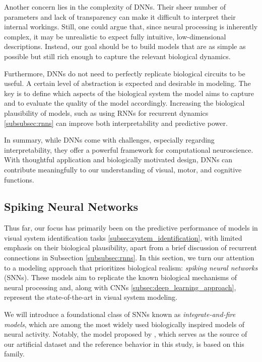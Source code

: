 Another concern lies in the complexity of DNNs. Their sheer number of parameters and lack of transparency can make it difficult to interpret their internal workings. Still, one could argue that, since neural processing is inherently complex, it may be unrealistic to expect fully intuitive, low-dimensional descriptions. Instead, our goal should be to build models that are as simple as possible but still rich enough to capture the relevant biological dynamics.

Furthermore, DNNs do not need to perfectly replicate biological circuits to be useful. A certain level of abstraction is expected and desirable in modeling. The key is to define which aspects of the biological system the model aims to capture and to evaluate the quality of the model accordingly. Increasing the biological plausibility of models, such as using RNNs for recurrent dynamics \ref{subsubsec:rnns} can improve both interpretability and predictive power.

In summary, while DNNs come with challenges, especially regarding interpretability, they offer a powerful framework for computational neuroscience. With thoughtful application and biologically motivated design, DNNs can contribute meaningfully to our understanding of visual, motor, and cognitive functions.

\subsection{Spiking Neural Networks}
\label{subsec:spiking_neural_nets}
Thus far, our focus has primarily been on the predictive performance of models in visual system identification tasks \ref{subsec:system_identification}, with limited emphasis on their biological plausibility, apart from a brief discussion of recurrent connections in Subsection \ref{subsubsec:rnns}. In this section, we turn our attention to a modeling approach that prioritizes biological realism: \emph{spiking neural networks} (SNNs). These models aim to replicate the known biological mechanisms of neural processing and, along with CNNs \ref{subsec:deep_learning_approach}, represent the state-of-the-art in visual system modeling.

We will introduce a foundational class of SNNs known as \emph{integrate-and-fire models}, which are among the most widely used biologically inspired models of neural activity. Notably, the model proposed by \citet{antolik2024comprehensive}, which serves as the source of our artificial dataset and the reference behavior in this study, is based on this family.

